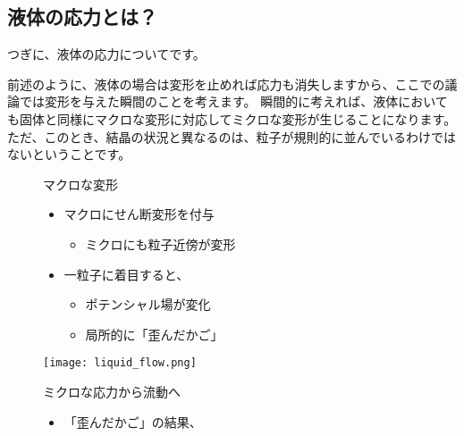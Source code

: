 \documentclass[uplatex,dvipdfmx,a4paper,11pt]{jsarticle}
\begin{document}
\subsection{液体の応力とは？}

つぎに、液体の応力についてです。

前述のように、液体の場合は変形を止めれば応力も消失しますから、ここでの議論では変形を与えた瞬間のことを考えます。
瞬間的に考えれば、液体においても固体と同様にマクロな変形に対応してミクロな変形が生じることになります。
ただ、このとき、結晶の状況と異なるのは、粒子が規則的に並んでいるわけではないということです。
\begin{figure}[htb]
	\begin{center}
		\begin{minipage}{0.45\textwidth}
			\large
			\begin{itembox}[l]{マクロな変形}
				\begin{itemize}
					\item マクロにせん断変形を付与
					\begin{itemize}
						\item ミクロにも粒子近傍が変形
					\end{itemize}
					\item 一粒子に着目すると、
					\begin{itemize}
						\item ポテンシャル場が変化
						\item 局所的に「歪んだかご」
					\end{itemize}
				\end{itemize}
			\end{itembox}
			\begin{center}
				\texttt{[image: liquid\_flow.png]}
			\end{center}
		\end{minipage}
		\begin{minipage}{0.45\textwidth}
			\large
			\begin{itembox}[l]{ミクロな応力から流動へ}
				\begin{itemize}
					\item 「歪んだかご」の結果、
					\begin{itemize}

\end{itemize}
\end{itemize}
\end{itembox}
\end{minipage}
\end{center}
\end{figure}
\end{document}
